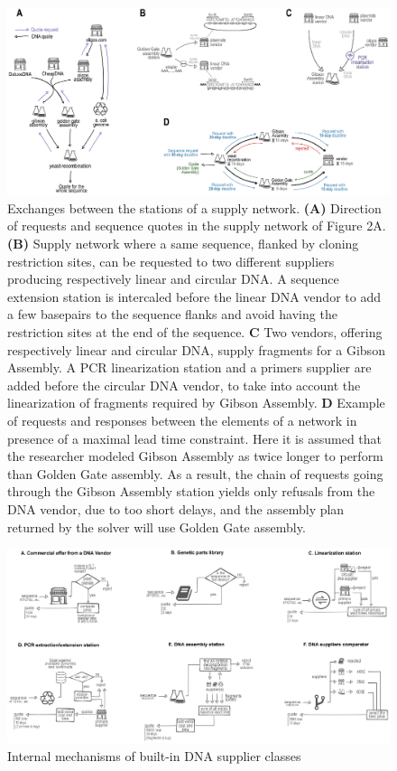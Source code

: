 \begin{figure}[!tpb]
  \includegraphics[width=\textwidth]{figures/figure_5_supply_networks_function.eps}
  \caption{Exchanges between the stations of a supply network.
  \textbf{(A)} Direction of requests and sequence quotes in the supply network of Figure 2A.
  \textbf{(B)} Supply network where a same sequence, flanked by cloning restriction sites, can be requested to two different suppliers producing respectively linear and circular DNA. A sequence extension station is intercaled before the linear DNA vendor to add a few basepairs to the sequence flanks and avoid having the restriction sites at the end of the sequence.
  \textbf{C} Two vendors, offering respectively linear and circular DNA, supply fragments for a Gibson Assembly. A PCR linearization station and a primers supplier are added before the circular DNA vendor, to take into account the linearization of fragments required by Gibson Assembly.
  \textbf{D} Example of requests and responses between the elements of a network in presence of a maximal lead time constraint. Here it is assumed that the researcher modeled Gibson Assembly as twice longer to perform than Golden Gate assembly. As a result, the chain of requests going through the Gibson Assembly station yields only refusals from the DNA vendor, due to too short delays, and the assembly plan returned by the solver will use Golden Gate assembly.}
  \label{supply_networks}
\end{figure}


\begin{figure}[!tpb]
  \includegraphics[width=\textwidth]{figures/figure_6_supply_network_elements.eps}
  \caption{Internal mechanisms of built-in DNA supplier classes}
  \label{dna suppliers_internals}
\end{figure}


